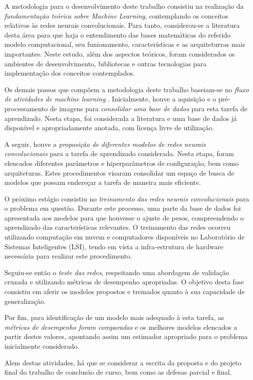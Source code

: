 A metodologia para o desenvolvimento deste trabalho consistiu na realização da \emph{fundamentação teórica sobre Machine Learning}, contemplando os conceitos relativos às redes neurais convolucionais. Para tanto, considerou-se a literatura desta área para que haja o entendimento das bases matemáticas do referido modelo computacional, seu funionamento, características e as arquiteturras mais importantes. Neste estudo, além dos aspectos teóricos, foram considerados os ambientes de desenvolvimento, bibliotecas e outras tecnologias para implementação dos conceitos contemplados.

Os demais passos que compõem a metodologia deste trabalho baseiam-se no \emph{fluxo de atividades de machine learning} \cite{marsland2015machine}. Inicialmente, houve a aquisição e o pré-processamento de imagens para \emph{consolidar uma base de dados} para esta tarefa de aprendizado. Nesta etapa, foi considerada a literatura e uma base de dados já disponível e apropriadamente anotada, com licença livre de utilização.

A seguir, houve a \emph{proposição de diferentes modelos de redes neurais convolucionais} para a tarefa de aprendizado considerada. Nesta etapa, foram elencados diferentes parâmetros e hiperparâmetros de configuração, bem como arquiteturas. Estes procedimentos visaram consolidar um espaço de busca de modelos que possam endereçar a tarefa de maneira mais eficiente.

O próximo estágio consistiu no \emph{treinamento das redes neurais convolucionais} para o problema em questão. Durante este processo, uma parte da base de dados foi apresentada aos modelos para que houvesse o ajuste de pesos, compreendendo o aprendizado das características relevantes. O treinamento das redes ocorreu utilizando computação em nuvem e computadores disponíveis no Laboratório de Sistemas Inteligentes (LSI), tendo em vista a infra-estrutura de hardware necessária para realizar este procedimento.

Seguiu-se então o \emph{teste das redes}, respeitando uma abordagem de validação cruzada e utilizando métricas de desempenho apropriadas. O objetivo desta fase consistiu em aferir os modelos propostos e treinados quanto à sua capacidade de generalização.

Por fim, para identificação de um modelo mais adequado à esta tarefa, as \emph{métricas de desempenho foram comparadas} e os melhores modelos elencados a partir destes valores, apontando assim um estimador apropriado para o problema inicialmente considerado.

Alem destas atividades, há que se considerar a escrita da proposta e do projeto final do trabalho de conclusão de curso, bem como as defesas parcial e final.
